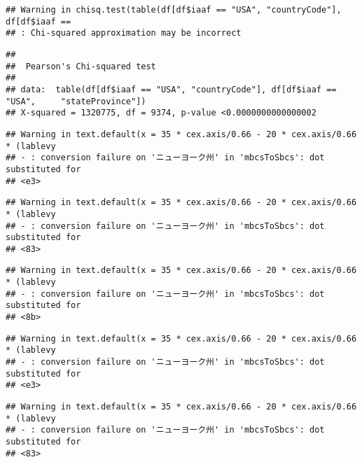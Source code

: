 \documentclass[
]{article}
\newenvironment{Shaded}{\begin{snugshade}}{\end{snugshade}}
\newcommand{\FunctionTok}[1]{\textcolor[rgb]{0.13,0.29,0.53}{\textbf{#1}}}
\newcommand{\NormalTok}[1]{#1}
\newcommand{\SpecialCharTok}[1]{\textcolor[rgb]{0.81,0.36,0.00}{\textbf{#1}}}
\newcommand{\StringTok}[1]{\textcolor[rgb]{0.31,0.60,0.02}{#1}}
\begin{document}
\begin{verbatim}
## Warning in chisq.test(table(df[df$iaaf == "USA", "countryCode"], df[df$iaaf ==
## : Chi-squared approximation may be incorrect
\end{verbatim}

\begin{verbatim}
## 
##  Pearson's Chi-squared test
## 
## data:  table(df[df$iaaf == "USA", "countryCode"], df[df$iaaf == "USA",     "stateProvince"])
## X-squared = 1320775, df = 9374, p-value <0.0000000000000002
\end{verbatim}

\begin{Shaded}
\end{Shaded}

\begin{verbatim}
## Warning in text.default(x = 35 * cex.axis/0.66 - 20 * cex.axis/0.66 * (lablevy
## - : conversion failure on 'ニューヨーク州' in 'mbcsToSbcs': dot substituted for
## <e3>
\end{verbatim}

\begin{verbatim}
## Warning in text.default(x = 35 * cex.axis/0.66 - 20 * cex.axis/0.66 * (lablevy
## - : conversion failure on 'ニューヨーク州' in 'mbcsToSbcs': dot substituted for
## <83>
\end{verbatim}

\begin{verbatim}
## Warning in text.default(x = 35 * cex.axis/0.66 - 20 * cex.axis/0.66 * (lablevy
## - : conversion failure on 'ニューヨーク州' in 'mbcsToSbcs': dot substituted for
## <8b>
\end{verbatim}

\begin{verbatim}
## Warning in text.default(x = 35 * cex.axis/0.66 - 20 * cex.axis/0.66 * (lablevy
## - : conversion failure on 'ニューヨーク州' in 'mbcsToSbcs': dot substituted for
## <e3>
\end{verbatim}

\begin{verbatim}
## Warning in text.default(x = 35 * cex.axis/0.66 - 20 * cex.axis/0.66 * (lablevy
## - : conversion failure on 'ニューヨーク州' in 'mbcsToSbcs': dot substituted for
## <83>
\end{verbatim}
\end{document}
